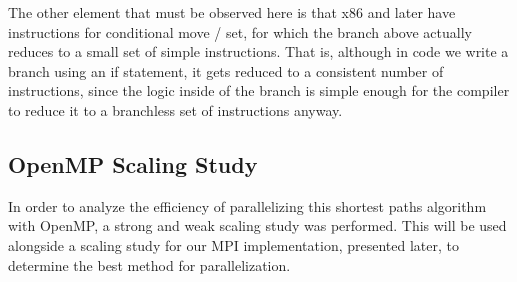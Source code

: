 \documentclass[11pt]{article}
\begin{document}
\noindent The other element that must be observed here is that x86 and later have instructions for conditional move / set, for which the branch above actually reduces to a small set of simple instructions.  That is, although in code we write a branch using an if statement, it gets reduced to a consistent number of instructions, since the logic inside of the branch is simple enough for the compiler to reduce it to a branchless set of instructions anyway.

\subsection{OpenMP Scaling Study}
In order to analyze the efficiency of parallelizing this shortest paths algorithm with OpenMP, a strong and weak scaling study was performed. This will be used alongside a scaling study for our MPI implementation, presented later, to determine the best method for parallelization. \\
\end{document}
